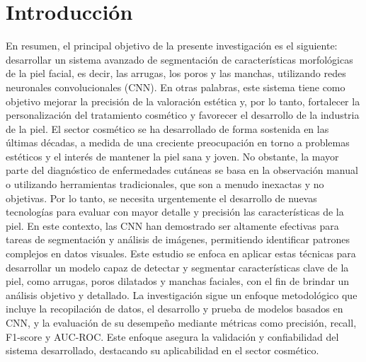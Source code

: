 
\chapter*{Introducción}
En resumen, el principal objetivo de la presente investigación es el siguiente: desarrollar un sistema avanzado de segmentación de características morfológicas de la piel facial, es decir, las arrugas, los poros y las manchas, utilizando redes neuronales convolucionales (CNN). En otras palabras, este sistema tiene como objetivo mejorar la precisión de la valoración estética y, por lo tanto, fortalecer la personalización del tratamiento cosmético y favorecer el desarrollo de la industria de la piel.
El sector cosmético se ha desarrollado de forma sostenida en las últimas décadas, a medida de una creciente preocupación en torno a problemas estéticos y el interés de mantener la piel sana y joven. No obstante, la mayor parte del diagnóstico de enfermedades cutáneas se basa en la observación manual o utilizando herramientas tradicionales, que son a menudo inexactas y no objetivas. Por lo tanto, se necesita urgentemente el desarrollo de nuevas tecnologías para evaluar con mayor detalle y precisión las características de la piel.
En este contexto, las CNN han demostrado ser altamente efectivas para tareas de segmentación y análisis de imágenes, permitiendo identificar patrones complejos en datos visuales. Este estudio se enfoca en aplicar estas técnicas para desarrollar un modelo capaz de detectar y segmentar características clave de la piel, como arrugas, poros dilatados y manchas faciales, con el fin de brindar un análisis objetivo y detallado.
La investigación sigue un enfoque metodológico que incluye la recopilación de datos, el desarrollo y prueba de modelos basados en CNN, y la evaluación de su desempeño mediante métricas como precisión, recall, F1-score y AUC-ROC. Este enfoque asegura la validación y confiabilidad del sistema desarrollado, destacando su aplicabilidad en el sector cosmético.